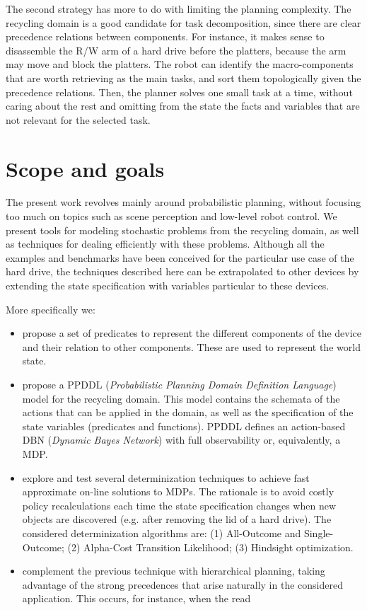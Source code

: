 \documentclass[../root.tex]{subfiles}
\begin{document}
The second strategy has more to do with limiting the planning complexity.
The recycling domain is a good candidate for task decomposition, since
there are clear precedence relations between components. For instance,
it makes sense to disassemble the R/W arm of a hard drive before the
platters, because the arm may move and block the platters. The robot
can identify the macro-components that are worth retrieving as the main
tasks, and sort them topologically given the precedence relations. Then,
the planner solves one small task at a time, without caring about
the rest and omitting from the state the facts and variables that are not
relevant for the selected task.

\section{Scope and goals}

The present work revolves mainly around probabilistic planning, without focusing too much
on topics such as scene perception and low-level robot control.
We present tools for modeling stochastic problems from the recycling
domain, as well as techniques for
dealing efficiently with these problems. Although all the examples and benchmarks
have been conceived for the particular use case of the hard drive,
the techniques described here can be extrapolated to other devices by extending
the state specification with variables particular to these devices.

More specifically we:
\begin{itemize}
	\item propose a set of predicates to represent the different components of
	the device and their relation to other components. These are used to represent
	the world state.
	\item propose a PPDDL (\emph{Probabilistic Planning Domain Definition Language})
	model for the recycling domain. This model contains the schemata of the actions
	that can be applied in the domain, as well as the specification of the
	state variables (predicates and functions). PPDDL defines an action-based
	DBN (\emph{Dynamic Bayes Network}) with full observability or, equivalently,
	a MDP.
	\item explore and test several determinization techniques to achieve fast
	approximate on-line solutions to MDPs. The rationale is to avoid costly policy
	recalculations each time the state specification changes when new objects
	are discovered (e.g. after removing the lid of a hard drive). The considered
	determinization algorithms are: (1) All-Outcome and Single-Outcome;
	(2) Alpha-Cost Transition Likelihood; (3) Hindsight optimization.
	\item complement the previous technique with hierarchical planning, taking
	advantage of the strong precedences that arise naturally in the
	considered application. This occurs, for instance, when the read
\end{itemize}
\end{document}
